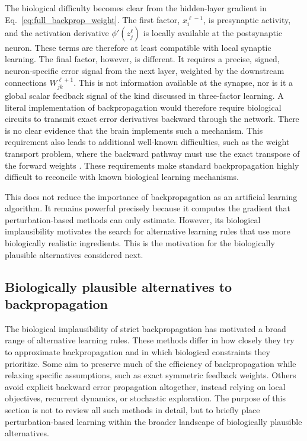 The biological difficulty becomes clear from the hidden-layer gradient in Eq.~\eqref{eq:full_backprop_weight}.
The first factor, \(x_i^{\ell-1}\), is presynaptic activity, and the activation derivative \(\phi'(z_j^\ell)\) is locally available at the postsynaptic neuron. These terms are therefore at least compatible with local synaptic learning. The final factor, however, is different. It requires a precise, signed, neuron-specific error signal from the next layer, weighted by the downstream connections \(W_{jk}^{\ell+1}\). This is not information available at the synapse, nor is it a global scalar feedback signal of the kind discussed in three-factor learning. A literal implementation of backpropagation would therefore require biological circuits to transmit exact error derivatives backward through the network. There is no clear evidence that the brain implements such a mechanism. This requirement also leads to additional well-known difficulties, such as the weight transport problem, where the backward pathway must use the exact transpose of the forward weights \parencite{crick_recent_1989,lillicrap_backpropagation_2020}. These requirements make standard backpropagation highly difficult to reconcile with known biological learning mechanisms.

This does not reduce the importance of backpropagation as an artificial learning algorithm. It remains powerful precisely because it computes the gradient that perturbation-based methods can only estimate. However, its biological implausibility motivates the search for alternative learning rules that use more biologically realistic ingredients. This is the motivation for the biologically plausible alternatives considered next.
\subsection{Biologically plausible alternatives to backpropagation}

The biological implausibility of strict backpropagation has motivated a broad range of alternative learning rules. These methods differ in how closely they try to approximate backpropagation and in which biological constraints they prioritize. Some aim to preserve much of the efficiency of backpropagation while relaxing specific assumptions, such as exact symmetric feedback weights. Others avoid explicit backward error propagation altogether, instead relying on local objectives, recurrent dynamics, or stochastic exploration. The purpose of this section is not to review all such methods in detail, but to briefly place perturbation-based learning within the broader landscape of biologically plausible alternatives.

